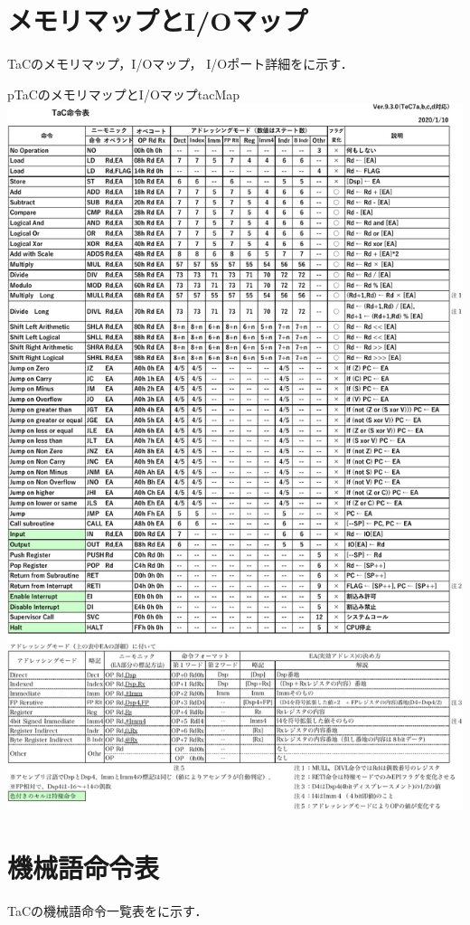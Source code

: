 \section{メモリマップとI/Oマップ}
TaCのメモリマップ，I/Oマップ，
I/Oポート詳細をに示す．

\begin{myfig}{p}{TaCのメモリマップとI/Oマップ}{tacMap}
  \includegraphics[scale=0.86,page=4]{Fig/TaCInst-crop.pdf}
\end{myfig}

\section{機械語命令表}
TaCの機械語命令一覧表をに示す．

